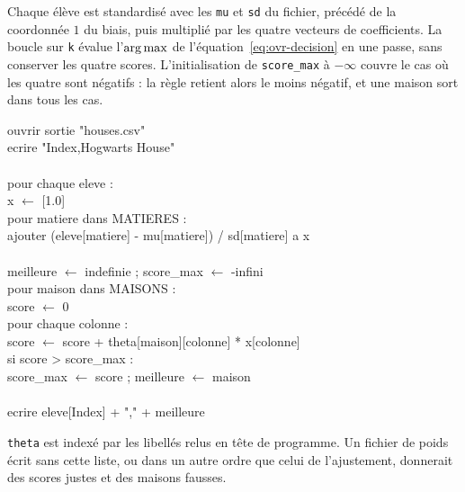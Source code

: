 Chaque élève est standardisé avec les \texttt{mu} et \texttt{sd} du fichier,
précédé de la coordonnée $1$ du biais, puis multiplié par les quatre vecteurs de
coefficients. La boucle sur \texttt{k} évalue l'$\operatorname*{arg\,max}$ de
l'équation~\eqref{eq:ovr-decision} en une passe, sans conserver les quatre
scores. L'initialisation de \texttt{score\_max} à $-\infty$ couvre le cas où les
quatre sont négatifs : la règle retient alors le moins négatif, et une maison
sort dans tous les cas.

\begin{pseudo}
ouvrir sortie "houses.csv"\\
ecrire "Index,Hogwarts House"\\
\\
pour chaque eleve :\\
\hspace*{2em}x $\leftarrow$ [1.0]\\
\hspace*{2em}pour matiere dans MATIERES :\\
\hspace*{4em}ajouter (eleve[matiere] - mu[matiere]) / sd[matiere] a x\\
\\
\hspace*{2em}meilleure $\leftarrow$ indefinie ; score\_max $\leftarrow$ -infini\\
\hspace*{2em}pour maison dans MAISONS :\\
\hspace*{4em}score $\leftarrow$ 0\\
\hspace*{4em}pour chaque colonne :\\
\hspace*{6em}score $\leftarrow$ score + theta[maison][colonne] * x[colonne]\\
\hspace*{4em}si score > score\_max :\\
\hspace*{6em}score\_max $\leftarrow$ score ; meilleure $\leftarrow$ maison\\
\\
\hspace*{2em}ecrire eleve[Index] + "," + meilleure
\end{pseudo}

\texttt{theta} est indexé par les libellés relus en tête de programme. Un
fichier de poids écrit sans cette liste, ou dans un autre ordre que celui de
l'ajustement, donnerait des scores justes et des maisons fausses.

